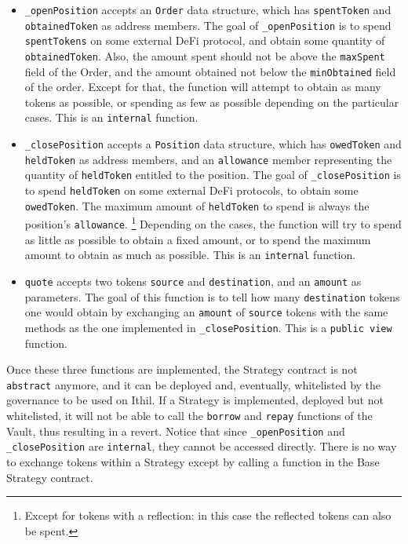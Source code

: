 \documentclass[a4paper,10 pt]{article}
\theoremstyle{definition}
\begin{document}
\begin{itemize}
\item \verb|_openPosition| accepts an \verb|Order| data structure, which has \verb|spentToken| and \verb|obtainedToken| as address members. The goal of \verb|_openPosition| is to spend \verb|spentTokens| on some external DeFi protocol, and obtain some quantity of \verb|obtainedToken|. Also, the amount spent should not be above the \verb|maxSpent| field of the Order, and the amount obtained not below the \verb|minObtained| field of the order. Except for that, the function will attempt to obtain as many tokens as possible, or spending as few as possible depending on the particular cases. This is an \verb|internal| function.
\item \verb|_closePosition| accepts a \verb|Position| data structure, which has \verb|owedToken| and \verb|heldToken| as address members, and an \verb|allowance| member representing the quantity of \verb|heldToken| entitled to the position. The goal of \verb|_closePosition| is to spend \verb|heldToken| on some external DeFi protocols, to obtain some \verb|owedToken|. The maximum amount of \verb|heldToken| to spend is always the position's \verb|allowance|. \footnote{Except for tokens with a reflection: in this case the reflected tokens can also be spent.} Depending on the cases, the function will try to spend as little as possible to obtain a fixed amount, or to spend the maximum amount to obtain as much as possible. This is an \verb|internal| function.
\item \verb|quote| accepts two tokens \verb|source| and \verb|destination|, and an \verb|amount| as parameters. The goal of this function is to tell how many \verb|destination| tokens one would obtain by exchanging an \verb|amount| of \verb|source| tokens with the same methods as the one implemented in \verb|_closePosition|. This is a \verb|public view| function.
\end{itemize}

Once these three functions are implemented, the Strategy contract is not \verb|abstract| anymore, and it can be deployed and, eventually, whitelisted by the governance to be used on Ithil. If a Strategy is implemented, deployed but not whitelisted, it will not be able to call the \verb|borrow| and \verb|repay| functions of the Vault, thus resulting in a revert. Notice that since \verb|_openPosition| and \verb|_closePosition| are \verb|internal|, they cannot be accessed directly. There is no way to exchange tokens within a Strategy except by calling a function in the Base Strategy contract.
\end{document}
